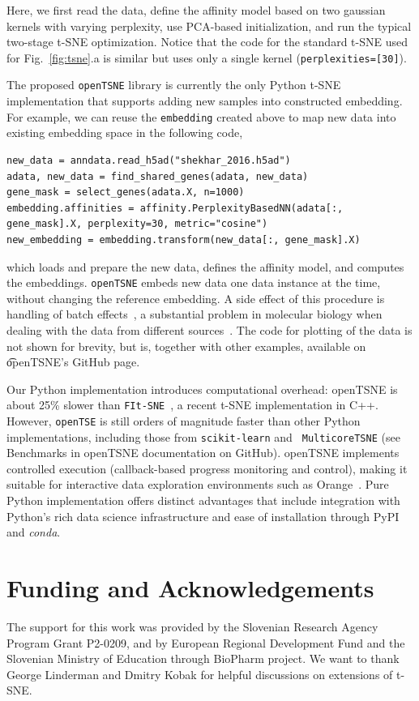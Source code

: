 \documentclass{bioinfo}
\begin{document}
\noindent Here, we first read the data, define the affinity model based on two
gaussian kernels with varying perplexity, use PCA-based initialization, and run
the typical two-stage t-SNE optimization. Notice that the code for the standard
t-SNE used for Fig.~\ref{fig:tsne}.a is similar but uses only a single kernel
({\tt perplexities=[30]}).

The proposed {\tt openTSNE} library is currently the only Python t-SNE
implementation that supports adding new samples into constructed embedding. For
example, we can reuse the {\tt embedding} created above to map new data into
existing embedding space in the following code,

\begin{lstlisting}
new_data = anndata.read_h5ad("shekhar_2016.h5ad")
adata, new_data = find_shared_genes(adata, new_data)
gene_mask = select_genes(adata.X, n=1000)
embedding.affinities = affinity.PerplexityBasedNN(adata[:, gene_mask].X, perplexity=30, metric="cosine")
new_embedding = embedding.transform(new_data[:, gene_mask].X)
\end{lstlisting}

\noindent which loads and prepare the new data, defines the affinity model, and
computes the embeddings. {\tt openTSNE} embeds new data one data instance at
the time, without changing the reference embedding. A side effect of this
procedure is handling of batch effects~\cite{Pavlin2019-DS}, a substantial
problem in molecular biology when dealing with the data from different
sources~\cite{batch-effects}. The code for plotting of the data is not shown
for brevity, but is, together with other examples, available on {\t openTSNE}'s
GitHub page. 

Our Python implementation introduces computational overhead: openTSNE is about
25\% slower than {\tt FIt-SNE}~\citep{fi_tsne}, a recent t-SNE implementation
in C++. However, {\tt openTSE} is still orders of magnitude faster than other
Python implementations, including those from {\tt scikit-learn} and {\tt
MulticoreTSNE} (see Benchmarks in openTSNE documentation on GitHub). openTSNE
implements controlled execution (callback-based progress monitoring and
control), making it suitable for interactive data exploration environments such
as Orange~\cite{scorange}. Pure Python implementation offers distinct
advantages that include integration with Python's rich data science
infrastructure and ease of installation through PyPI and {\em conda}.

\section*{Funding and Acknowledgements}
The support for this work was provided by the Slovenian Research Agency Program
Grant P2-0209, and by European Regional Development Fund and the Slovenian
Ministry of Education through BioPharm project. We want to thank George
Linderman and Dmitry Kobak for helpful discussions on extensions of t-SNE.
\end{document}
